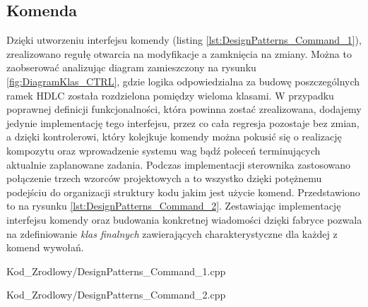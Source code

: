     \subsection{Komenda}
        Dzięki utworzeniu interfejsu komendy (listing \ref{lst:DesignPatterns_Command_1}), zrealizowano regułę otwarcia na modyfikacje a zamknięcia na zmiany. Można to zaobserować analizując diagram 
        zamieszczony na rysunku \ref{fig:DiagramKlas_CTRL}, gdzie logika odpowiedzialna za budowę poszczególnych ramek HDLC została rozdzielona pomiędzy wieloma klasami.
        W przypadku poprawnej definicji funkcjonalności, która powinna zostać zrealizowana, dodajemy jedynie implementację tego interfejsu,
        przez co cała regresja pozostaje bez zmian, a dzięki kontrolerowi, który kolejkuje komendy można pokusić się o realizację kompozytu oraz
        wprowadzenie systemu wag bądź poleceń terminujących aktualnie zaplanowane zadania\cite{gamma2005wzorce}.
        Podczas implementacji sterownika zastosowano połączenie trzech wzorców projektowych a to wszystko dzięki potężnemu podejściu do organizacji
        struktury kodu jakim jest użycie komend. Przedstawiono to na rysunku \ref{lst:DesignPatterns_Command_2}. Zestawiając implementację interfejsu komendy oraz budowania konkretnej wiadomości dzięki fabryce
        pozwala na zdefiniowanie \textit{klas finalnych} zawierających charakterystyczne dla każdej z komend wywołań. 
    \newpage
        
            {Kod_Zrodlowy/DesignPatterns_Command_1.cpp}
        
            {Kod_Zrodlowy/DesignPatterns_Command_2.cpp}
